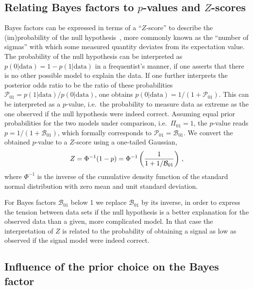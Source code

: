 	\subsection{Relating Bayes factors to $p$-values and $Z$-scores}
	\label{sec:z-scores}
	Bayes factors can be expressed in terms of a ``$Z$-score'' to describe the (im)probability of the null hypothesis~\cite{Athron:2020maw,Fowlie:2019ydo}, more commonly known as the ``number of sigmas'' with which some measured quantity deviates from  its expectation value. The probability of the null hypothesis can be interpreted as $p(0|\text{data}) = 1 - p(1|\text{data})$ in a frequentist's manner, if one asserts that there is no other possible model to explain the data. If one further interprets the posterior odds ratio to be the ratio of these probabilities $\mathcal{P}_{01} = p(1|\text{data}) / p(0|\text{data})$, one obtains $p(0|\text{data}) = 1/(1 + \mathcal{P}_{01})$. This can be interpreted as a $p$-value, i.e.~the probability to measure data as extreme as the one observed if the null hypothesis were indeed correct. Assuming equal prior probabilities for the two models under comparison, i.e.~$\Pi_{01} = 1$, the $p$-value reads $p = 1/(1 + \mathcal{B}_{01})$, which formally corresponds to $\mathcal{P}_{01}=\mathcal{B}_{01}$. We convert the obtained $p$-value to a $Z$-score using a one-tailed Gaussian,
	\begin{align}
		Z = \Phi^{-1}(1 - p) = \Phi^{-1} \left( \frac{1}{1 + {1}/{\mathcal{B}_{01}}} \right) \,, \label{eq:z-score}
	\end{align}
	where $\Phi^{-1}$ is the inverse of the cumulative density function of the standard normal distribution with zero  mean and unit standard deviation. 
	
	For Bayes factors $\mathcal{B}_{01}$ below 1 we replace $\mathcal{B}_{01}$ by its inverse, in order to express the tension between data sets if the null hypothesis is a better explanation for the observed data than a given, more complicated model. In that case the interpretation of $Z$ is related to the probability of obtaining a signal as low as 
	observed if the signal model were indeed correct.
	
	
	\subsection{Influence of the prior choice on the Bayes factor}
	\label{sec:priorchoice}
	
